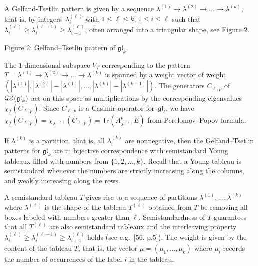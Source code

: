 \documentclass[10pt,a4paper]{article}
\begin{document}
A Gelfand-Tsetlin pattern is given by a sequence $\lambda^{(1)}\to\lambda^{(2)}\to\dots\to\lambda^{(k)}$, that is, by integers $\lambda^{(\ell)}_{i}$ with $1\leq\ell\leq k$, $1\leq i\leq\ell$ such that $\lambda^{(\ell)}_{i}\geq\lambda^{(\ell-1)}_{i}\geq\lambda^{(\ell)}_{i+1}$, often arranged into a triangular shape, see Figure 2.




Figure 2: Gelfand–Tsetlin pattern of $\mathfrak{gl}_{k}$.



The $1$-dimensional subspace $V_{T}$ corresponding to the pattern $T=\lambda^{(1)}\to\lambda^{(2)}\to\dots\to\lambda^{(k)}$ is spanned by a weight vector of weight $(|\lambda^{(1)}|,|\lambda^{(2)}|-|\lambda^{(1)}|,\dots,|\lambda^{(k)}|-|\lambda^{(k-1)}|)$.
The generators $C_{\ell,p}$ of $\mathcal{G}\hskip-1.00006pt\mathcal{Z}(\mathfrak{gl}_{k})$ act on this space as multiplications by the corresponding eigenvalues $\chi_{T}(C_{\ell,p})$.
Since $C_{\ell,p}$ is a Casimir operator for $\mathfrak{gl}_{\ell}$, we have $\chi_{T}(C_{\ell,p})=\chi_{\lambda^{(\ell)}}(C_{\ell,p})=\mathsf{Tr}(A_{\lambda^{(\ell)}}^{p}E)$ from Perelomov–Popov formula.





If $\lambda^{(k)}$ is a partition, that is, all $\lambda^{(k)}_{i}$ are nonnegative, then the Gelfand–Tsetlin patterns for $\mathfrak{gl}_{k}$ are in bijective correspondence with semistandard Young tableaux filled with numbers from $\{1,2,\dots,k\}$. Recall that a Young tableau is semistandard whenever the numbers are strictly increasing along the columns, and weakly increasing along the rows.





A semistandard tableau $T$ gives rise to a sequence of partitions $\lambda^{(1)},\dots,\lambda^{(k)}$ where $\lambda^{(\ell)}$ is the shape of the tableau $T^{(\ell)}$ obtained from $T$ be removing all boxes labeled with numbers greater than $\ell$.
Semistandardness of $T$ guarantees that all $T^{(\ell)}$ are also semistandard tableaux and the interleaving property $\lambda^{(\ell)}_{i}\geq\lambda^{(\ell-1)}_{i}\geq\lambda^{(\ell)}_{i+1}$ holds (see e.\thinspace{}g. [56, p.5]).
The weight is given by the content of the tableau $T$, that is, the vector $\mu=(\mu_{1},\dots,\mu_{k})$ where $\mu_{i}$ records the number of occurrences of the label $i$ in the tableau.
\end{document}
